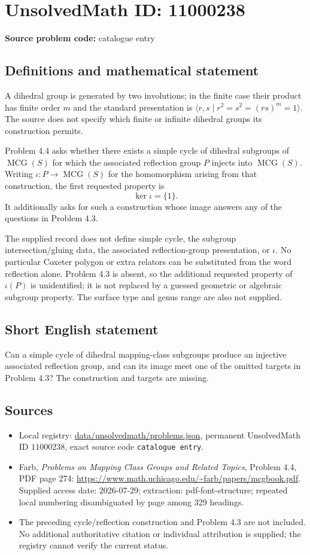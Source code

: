 \documentclass[11pt]{article}
\begin{document}
\section*{UnsolvedMath ID: 11000238}
\textbf{Source problem code:} catalogue entry
\subsection{Definitions and mathematical statement}
A dihedral group is generated by two involutions; in the finite case their product has finite order $m$ and the standard presentation is $\langle r,s\mid r^2=s^2=(rs)^m=1\rangle$. The source does not specify which finite or infinite dihedral groups its construction permits.

Problem 4.4 asks whether there exists a simple cycle of dihedral subgroups of $\operatorname{MCG}(S)$ for which the associated reflection group $P$ injects into $\operatorname{MCG}(S)$. Writing $\iota:P\to\operatorname{MCG}(S)$ for the homomorphism arising from that construction, the first requested property is
\[
 \ker\iota=\{1\}.
\]
It additionally asks for such a construction whose image answers any of the questions in Problem 4.3.

The supplied record does not define simple cycle, the subgroup intersection/gluing data, the associated reflection-group presentation, or $\iota$. No particular Coxeter polygon or extra relators can be substituted from the word reflection alone. Problem 4.3 is absent, so the additional requested property of $\iota(P)$ is unidentified; it is not replaced by a guessed geometric or algebraic subgroup property. The surface type and genus range are also not supplied.
\subsection{Short English statement}
Can a simple cycle of dihedral mapping-class subgroups produce an injective associated reflection group, and can its image meet one of the omitted targets in Problem 4.3? The construction and targets are missing.
\subsection{Sources}
\begin{itemize}
\item Local registry: \url{data/unsolvedmath/problems.json}, permanent UnsolvedMath ID $11000238$, exact source code \texttt{catalogue entry}.
\item Farb, \emph{Problems on Mapping Class Groups and Related Topics}, Problem 4.4, PDF page 274: \url{https://www.math.uchicago.edu/~farb/papers/mcgbook.pdf}. Supplied access date: 2026-07-29; extraction: pdf-font-structure; repeated local numbering disambiguated by page among 329 headings.
\item The preceding cycle/reflection construction and Problem 4.3 are not included. No additional authoritative citation or individual attribution is supplied; the registry cannot verify the current status.
\end{itemize}
\end{document}
